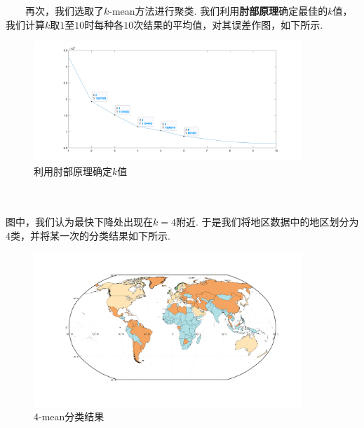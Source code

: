 \documentclass[a4paper, titlepage]{article}
\begin{document}
    　　再次，我们选取了$k$-mean方法进行聚类. 我们利用\textbf{肘部原理}确定最佳的$k$值，我们计算$k$取$1$至$10$时每种各$10$次结果的平均值，对其误差作图，如下所示.\\
    \begin{minipage}{\textwidth}
        \begin{figure}[H]
            \centering
            \includegraphics[width=0.9\textwidth]{./images/Elbow.png}
            \vspace{-1.5em}
            \caption{利用肘部原理确定$k$值}
            \label{images:Elbow}
        \end{figure}
    \end{minipage}\\\quad\\
    图中，我们认为最快下降处出现在$k=4$附近. 于是我们将地区数据中的地区划分为$4$类，并将某一次的分类结果如下所示.\\
    \begin{minipage}{\textwidth}
        \begin{figure}[H]
            \centering
            \includegraphics[width=0.9\textwidth]{./images/World_Classification.png}
            \vspace{-3em}
            \caption{$4$-mean分类结果}
            \label{images:World_Classification}
        \end{figure}
    \end{minipage}\\\quad\\
    
\end{document}
